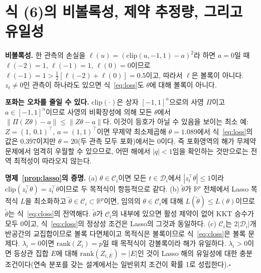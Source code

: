 
\appendix

\section{식 (6)의 비볼록성, 제약 추정량, 그리고 유일성}
\label{app:convexity}

\textbf{비볼록성.} 한 관측의 손실을 $\ell(u)=(\mathrm{clip}(u,-1,1)-a)^2$라 하면
$a=0$일 때 $\ell(-2)=1$, $\ell(-1)=1$, $\ell(0)=0$이므로
$\ell(-1)=1>\tfrac{1}{2}[\ell(-2)+\ell(0)]=0.5$이고, 따라서 $\ell$은 볼록이 아니다.
$z_t\neq 0$인 관측이 하나라도 있으면 식~\eqref{eq:loss}도 $\theta$에 대해 볼록이 아니다.

\textbf{포화는 오차를 줄일 수 있다.} $\mathrm{clip}(\cdot)$은 상자 $[-1,1]^n$으로의
사영 $\Pi$이고 $a\in[-1,1]^n$이므로 사영의 비확장성에 의해 모든 $\theta$에서
$\lVert\Pi(Z\theta)-a\rVert\le\lVert Z\theta-a\rVert$다. 이것이 등호가 아닐 수 있음을
보이는 최소 예: $Z=(1,\ 0.1)^{\top}$, $a=(1,1)^{\top}$이면 무제약 최소제곱해
$\theta=1.089$에서 식~\eqref{eq:loss}의 값은 $0.397$이지만 $\theta=20$(두 관측 모두
포화)에서는 $0$이다. 즉 포화영역의 해가 무제약 문제에서 엄격히 우월할 수 있으므로,
어떤 해에서 $|q|<1$임을 확인하는 것만으로는 전역 최적성이 따라오지 않는다.

\textbf{명제~\ref{prop:lasso}의 증명.}
(a) $\theta\in\mathcal{C}_i$이면 모든 $t\in\mathcal{D}_i$에서 $|z_t^{\top}\theta|\le1$이라
$\mathrm{clip}(z_t^{\top}\theta)=z_t^{\top}\theta$이므로 두 목적식이 항등적으로 같다.
(b) $\tilde\theta$가 $\mathbb{R}^{p}$ 전체에서 Lasso 목적식 $L$을 최소화하고
$\tilde\theta\in\mathcal{C}_i\subset\mathbb{R}^{p}$이면, 임의의 $\theta\in\mathcal{C}_i$에
대해 $L(\tilde\theta)\le L(\theta)$이므로 $\tilde\theta$는 식~\eqref{eq:closs}의 전역해다.
$\tilde\theta$가 $\mathcal{C}_i$의 내부에 있으면 활성 제약이 없어 KKT 승수가 모두 0이고,
식~\eqref{eq:closs}의 정상성 조건은 Lasso의 그것과 동일하다.
(c) $\mathcal{C}_i$는 $2|\mathcal{D}_i|$개 반공간의 교집합이므로 볼록 다면체이고 목적식은
볼록이므로 식~\eqref{eq:closs}은 볼록 문제다. $\lambda_i=0$이면 $\mathrm{rank}(Z_i)=p$일 때
목적식이 강볼록이라 해가 유일하다. $\lambda_i>0$이면 등상관 집합 $E$에 대해
$\mathrm{rank}(Z_{i,E})=|E|$인 것이 Lasso 해의 유일성에 대한 충분조건이다(연속 분포를
갖는 설계에서는 일반위치 조건이 확률 1로 성립한다).\hfill$\square$

